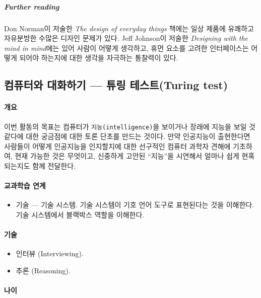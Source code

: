 \documentclass[]{article}
\begin{document}
\subparagraph{Further reading}\label{further-reading}

Don Norman이 저술한 \emph{The design of everyday things} 책에는 일상
제품에 유쾌하고 자유분방한 수많은 디자인 문제가 있다. Jeff Johnson이
저술한 \emph{Designing with the mind in mind}에는 있어 사람이 어떻게
생각하고, 휴먼 요소를 고려한 인터페이스는 어떻게 되어야 하는지에 대한
생각을 자극하는 통찰력이 있다.

\subsection{컴퓨터와 대화하기 --- 튜링 테스트(Turing
test)}\label{mdash--turing-test}

\mbox{}\paragraph{개요}\label{section-269}

이번 활동의 목표는 컴퓨터가 \texttt{지능(intelligence)}을 보이거나
장래에 지능을 보일 것 같다에 대한 궁금점에 대한 토론 단초를 만드는
것이다. 만약 인공지능이 출현한다면 사람들이 어떻게 인공지능을 인지할지에
대한 선구적인 컴퓨터 과학자 견해에 기초하여, 현재 가능한 것은 무엇이고,
신중하게 고안된 ``지능''을 시연해서 얼마나 쉽게 현혹되는지도 함께
전달한다.

\mbox{}\paragraph{교과학습 연계}\label{section-270}

\begin{itemize}
\itemsep1pt\parskip0pt
\item
  기술 --- 기술 시스템. 기술 시스템이 기호 언어 도구로 표현된다는 것을
  이해한다. 기술 시스템에서 블랙박스 역할을 이해한다.
\end{itemize}

\mbox{}\paragraph{기술}\label{section-271}

\begin{itemize}
\itemsep1pt\parskip0pt
\item
  인터뷰 (Interviewing).
\item
  추론 (Reasoning).
\end{itemize}

\mbox{}\paragraph{나이}\label{section-272}
\end{document}
